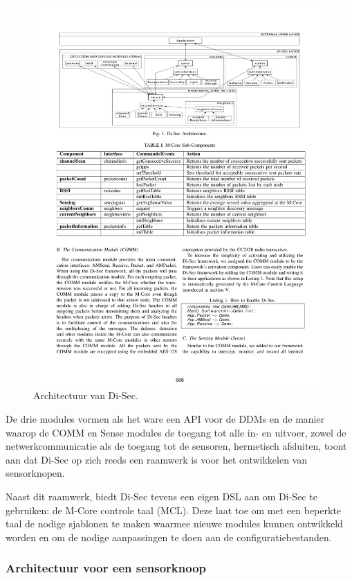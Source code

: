 \begin{figure}[ht]
  \centering
  \includegraphics[width=\linewidth]{resources/di-sec-architecture.pdf}
  \caption{Architectuur van Di-Sec. \citep{valero2012di}}
  \label{fig:di-sec-architecture}
\end{figure}

De drie modules vormen als het ware een API voor de DDMs en de manier waarop de
COMM en Sense modules de toegang tot alle in- en uitvoer, zowel de
netwerkcommunicatie als de toegang tot de sensoren, hermetisch afsluiten, toont
aan dat Di-Sec op zich reeds een raamwerk is voor het ontwikkelen van
sensorknopen.

Naast dit raamwerk, biedt Di-Sec tevens een eigen DSL aan om Di-Sec te
gebruiken: de M-Core controle taal (MCL). Deze laat toe om met een beperkte
taal de nodige sjablonen te maken waarmee nieuwe modules kunnen ontwikkeld
worden en om de nodige aanpassingen te doen aan de configuratiebestanden.

\subsubsection*{Architectuur voor een sensorknoop}
\label{subsubsection:node-architecture}

